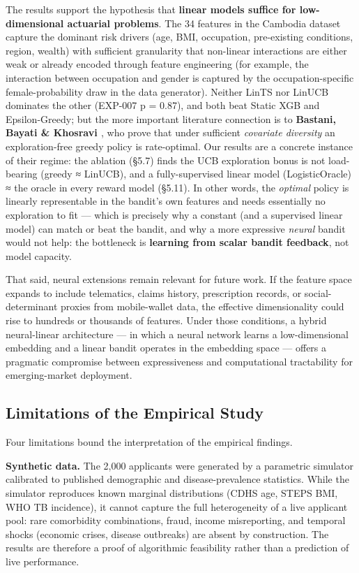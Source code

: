 The results support the hypothesis that \textbf{linear models suffice for low-dimensional actuarial problems}. The 34 features in the Cambodia dataset capture the dominant risk drivers (age, BMI, occupation, pre-existing conditions, region, wealth) with sufficient granularity that non-linear interactions are either weak or already encoded through feature engineering (for example, the interaction between occupation and gender is captured by the occupation-specific female-probability draw in the data generator). Neither LinTS nor LinUCB dominates the other (EXP-007 p = 0.87), and both beat Static XGB and Epsilon-Greedy; but the more important literature connection is to \textbf{Bastani, Bayati \& Khosravi \citeyearpar{Bastani2021}}, who prove that under sufficient \emph{covariate diversity} an exploration-free greedy policy is rate-optimal. Our results are a concrete instance of their regime: the ablation (§5.7) finds the UCB exploration bonus is not load-bearing (greedy ≈ LinUCB), and a fully-supervised linear model (LogisticOracle) ≈ the oracle in every reward model (§5.11). In other words, the \emph{optimal} policy is linearly representable in the bandit's own features and needs essentially no exploration to fit --- which is precisely why a constant (and a supervised linear model) can match or beat the bandit, and why a more expressive \emph{neural} bandit would not help: the bottleneck is \textbf{learning from scalar bandit feedback}, not model capacity.

That said, neural extensions remain relevant for future work. If the feature space expands to include telematics, claims history, prescription records, or social-determinant proxies from mobile-wallet data, the effective dimensionality could rise to hundreds or thousands of features. Under those conditions, a hybrid neural-linear architecture --- in which a neural network learns a low-dimensional embedding and a linear bandit operates in the embedding space --- offers a pragmatic compromise between expressiveness and computational tractability for emerging-market deployment.

\subsection{Limitations of the Empirical Study}\label{limitations-of-the-empirical-study}

Four limitations bound the interpretation of the empirical findings.

\textbf{Synthetic data.} The 2,000 applicants were generated by a parametric simulator calibrated to published demographic and disease-prevalence statistics. While the simulator reproduces known marginal distributions (CDHS age, STEPS BMI, WHO TB incidence), it cannot capture the full heterogeneity of a live applicant pool: rare comorbidity combinations, fraud, income misreporting, and temporal shocks (economic crises, disease outbreaks) are absent by construction. The results are therefore a proof of algorithmic feasibility rather than a prediction of live performance.

